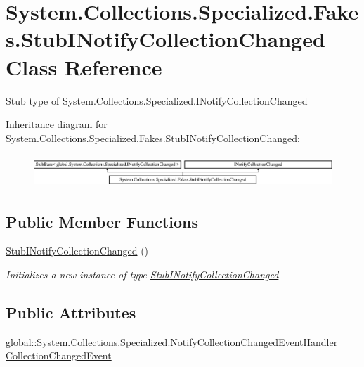 \hypertarget{class_system_1_1_collections_1_1_specialized_1_1_fakes_1_1_stub_i_notify_collection_changed}{\section{System.\-Collections.\-Specialized.\-Fakes.\-Stub\-I\-Notify\-Collection\-Changed Class Reference}
\label{class_system_1_1_collections_1_1_specialized_1_1_fakes_1_1_stub_i_notify_collection_changed}
}


Stub type of System.\-Collections.\-Specialized.\-I\-Notify\-Collection\-Changed 


Inheritance diagram for System.\-Collections.\-Specialized.\-Fakes.\-Stub\-I\-Notify\-Collection\-Changed\-:\begin{figure}[H]
\begin{center}
\leavevmode
\includegraphics[height=1.225383cm]{class_system_1_1_collections_1_1_specialized_1_1_fakes_1_1_stub_i_notify_collection_changed}
\end{center}
\end{figure}
\subsection*{Public Member Functions}
\begin{DoxyCompactItemize}
\item 
\hyperlink{class_system_1_1_collections_1_1_specialized_1_1_fakes_1_1_stub_i_notify_collection_changed_ac62d3e608ab6cea6626f3a5e7a6ba5cf}{Stub\-I\-Notify\-Collection\-Changed} ()
\begin{DoxyCompactList}\small\item\em Initializes a new instance of type \hyperlink{class_system_1_1_collections_1_1_specialized_1_1_fakes_1_1_stub_i_notify_collection_changed}{Stub\-I\-Notify\-Collection\-Changed}\end{DoxyCompactList}\end{DoxyCompactItemize}
\subsection*{Public Attributes}
\begin{DoxyCompactItemize}
\item 
global\-::\-System.\-Collections.\-Specialized.\-Notify\-Collection\-Changed\-Event\-Handler \hyperlink{class_system_1_1_collections_1_1_specialized_1_1_fakes_1_1_stub_i_notify_collection_changed_a8805cc17a7085732e17e04dc5b7fecac}{Collection\-Changed\-Event}
\end{DoxyCompactItemize}


